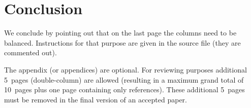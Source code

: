 \documentclass[conference,a4paper]{IEEEtran}
\begin{document}
\section{Conclusion}
\label{sec:conclusion}

We conclude by pointing out that on the last page the columns need to
be balanced. Instructions for that purpose are given in the source
file (they are commented out).




%



\appendix

The appendix (or appendices) are optional. For reviewing purposes
additional 5~pages (double-column) are allowed (resulting in a maximum
grand total of 10~pages plus one page containing only
references). These additional 5~pages must be removed in the final
version of an accepted paper.
\end{document}
